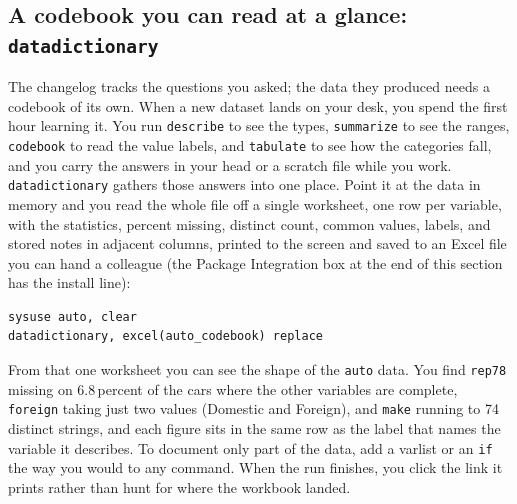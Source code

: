 \documentclass[
    a4paper,
    fontsize=10pt,
    twoside=true,
    numbers=noenddot,
]{kaobook}
\begin{document}
\subsection{A codebook you can read at a glance: \texttt{datadictionary}}\label{sec:datadictionary}
The changelog tracks the questions you asked; the data they produced needs a codebook of its own. When a new dataset lands on your desk, you spend the first hour learning it. You run \texttt{describe} to see the types, \texttt{summarize} to see the ranges, \texttt{codebook} to read the value labels, and \texttt{tabulate} to see how the categories fall, and you carry the answers in your head or a scratch file while you work. \texttt{datadictionary} gathers those answers into one place. Point it at the data in memory and you read the whole file off a single worksheet, one row per variable, with the statistics, percent missing, distinct count, common values, labels, and stored notes in adjacent columns, printed to the screen and saved to an Excel file you can hand a colleague (the Package Integration box at the end of this section has the install line):
\par
{\footnotesize
\begin{verbatim}
sysuse auto, clear
datadictionary, excel(auto_codebook) replace
\end{verbatim}
}
From that one worksheet you can see the shape of the \texttt{auto} data. You find \texttt{rep78} missing on 6.8\,percent of the cars where the other variables are complete, \texttt{foreign} taking just two values (Domestic and Foreign), and \texttt{make} running to 74 distinct strings, and each figure sits in the same row as the label that names the variable it describes. To document only part of the data, add a varlist or an \texttt{if} the way you would to any command. When the run finishes, you click the link it prints rather than hunt for where the workbook landed.
\end{document}

